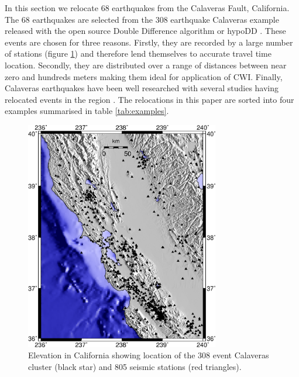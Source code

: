 \documentclass[extra]{gji}
\begin{document}
In this section we relocate 68 earthquakes from the Calaveras Fault,
California. The 68 earthquakes are selected from the 308 earthquake
Calaveras example released with the open source Double Difference
algorithm or hypoDD \citep{dr_Waldhauser00a,dr_Waldhauser01a}. These
events are chosen for three reasons. Firstly, they are recorded by a
large number of stations (figure
\ref{fig:-eqopti-California-Calaveras}) and therefore lend
themselves to accurate travel time location. Secondly, they are
distributed over a range of distances between near zero and hundreds
meters making them ideal for application of CWI. Finally, Calaveras
earthquakes have been well researched with several studies having
relocated events in the region \citep{dr_Waldhauser01a,
dr_Schaff02a, dr_Waldhauser08a}. The relocations in this paper are
sorted into four examples summarised in table \ref{tab:examples}.


\begin{figure}
\noindent\includegraphics[width =
20pc]{diags/CalaverasMap/gmt_california/CaliforniaCalaverasMap1.eps}
\caption{Elevation in California showing location of the 308 event
Calaveras cluster (black star) and 805 seismic stations (red
triangles).} \label{fig:-eqopti-California-Calaveras}
\end{figure}
\end{document}
